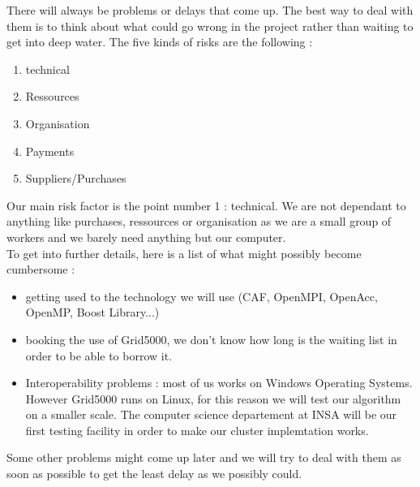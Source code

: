 There will always be problems or delays that come up. The best way to deal with them is to think about what could go wrong in the project rather than waiting to get into deep water. The five kinds of risks are the following :
\begin{enumerate}
	\item technical
	\item Ressources
	\item Organisation
	\item Payments
	\item Suppliers/Purchases
\end{enumerate}
Our main risk factor is the point number 1 : technical. We are not dependant to anything like purchases, ressources or organisation as we are a small group of workers and we barely need anything but our computer.\\
To get into further details, here is a list of what might possibly become cumbersome :
\begin{itemize}
	\item getting used to the technology we will use (CAF, OpenMPI, OpenAcc, OpenMP, Boost Library...)
	\item booking the use of Grid5000, we don't know how long is the waiting list in order to be able to borrow it.
	\item Interoperability problems : most of us works on Windows Operating Systems. However Grid5000 runs on Linux, for this reason we will test our algorithm on a smaller scale. The computer science departement at INSA will be our first testing facility in order to make our cluster implemtation works.
\end{itemize}
Some other problems might come up later and we will try to deal with them as soon as possible to get the least delay as we possibly could.~\\
